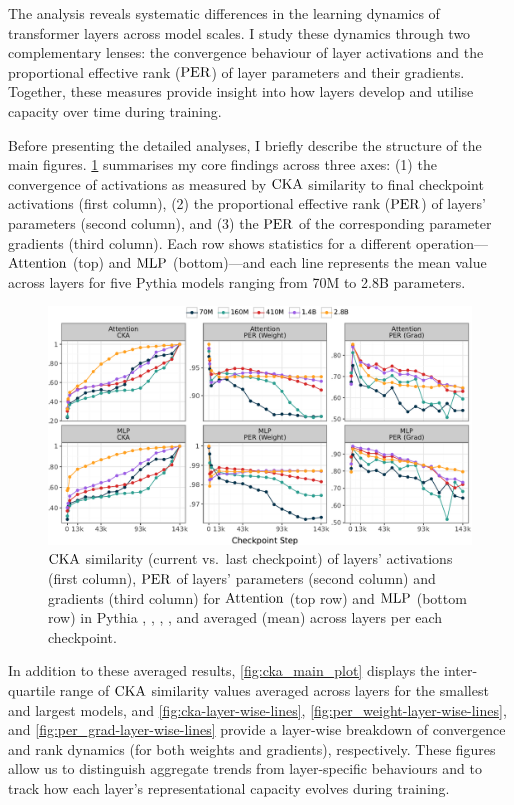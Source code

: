 The analysis reveals systematic differences in the learning dynamics of transformer layers across model scales. I study these dynamics through two complementary lenses: the convergence behaviour of layer activations and the proportional effective rank ($\mathrm{PER}$) of layer parameters and their gradients. Together, these measures provide insight into how layers develop and utilise capacity over time during training.

Before presenting the detailed analyses, I briefly describe the structure of the main figures. \cref{fig:main-results} summarises my core findings across three axes: (1) the convergence of activations as measured by $\mathrm{CKA}$ similarity to final checkpoint activations (first column), (2) the proportional effective rank ($\mathrm{PER}$) of layers' parameters (second column), and (3) the $\mathrm{PER}$ of the corresponding parameter gradients (third column). Each row shows statistics for a different operation—$\mathrm{Attention}$ (top) and $\mathrm{MLP}$ (bottom)—and each line represents the mean value across layers for five Pythia models ranging from 70M to 2.8B parameters.


\begin{figure}[h!]
    \centering
    \includegraphics[width=\linewidth]{chapters/tending-towards-stability/figures/results.pdf}
    \vspace{-15pt}
    \caption{$\mathrm{CKA}$ similarity (current vs.\ last checkpoint) of layers' activations (first column), $\mathrm{PER}$ of layers' parameters (second column) and gradients (third column) for $\mathrm{Attention}$ (top row) and $\mathrm{MLP}$ (bottom row) in Pythia \sevenmil, \sixmil, \fourmil, \onebil, and \twobil averaged (mean) across layers per each checkpoint.}
    \label{fig:main-results}
\end{figure}


In addition to these averaged results, \cref{fig:cka_main_plot} displays the inter-quartile range of $\mathrm{CKA}$ similarity values averaged across layers for the smallest and largest models, and \cref{fig:cka-layer-wise-lines}, \cref{fig:per_weight-layer-wise-lines}, and \cref{fig:per_grad-layer-wise-lines} provide a layer-wise breakdown of convergence and rank dynamics (for both weights and gradients), respectively. These figures allow us to distinguish aggregate trends from layer-specific behaviours and to track how each layer's representational capacity evolves during training.

